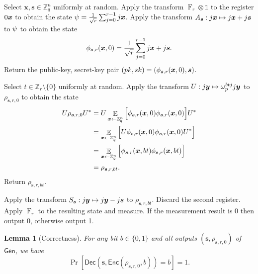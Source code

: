 \documentclass[11pt]{article}
\theoremstyle{plain}
\newtheorem{lemma}[theorem]{Lemma}
\theoremstyle{definition}
\DeclareMathOperator{\qft}{F}
\DeclareMathOperator{\E}{\mathbb{E}}
\let\ket\relax
\DeclarePairedDelimiter{\ket}{\lvert}{\rangle}
\let\bra\relax
\DeclarePairedDelimiter{\bra}{\langle}{\rvert}
\def\Z{\mathbb{Z}}
\def\gen{\mathsf{Gen}}
\def\enc{\mathsf{Enc}}
\def\dec{\mathsf{Dec}}
\begin{document}
\begin{description}[leftmargin = *]
\item [$\gen(1^n)$:] Select $\bm{x}, \bm{s} \in \Z_q^n$ uniformly at random. Apply the transform $\qft_r \otimes \mathds{1}$ to the register $\ket{0} \ket{\bm{x}}$ to obtain the state $\ket{\psi} = \frac{1}{\sqrt{r}} \sum_{j = 0}^{r - 1} \ket{j} \ket{\bm{x}}$. Apply the transform $A_{\bm{s}}: \ket{j}\ket{\bm{x}} \mapsto \ket{j}\ket{\bm{x} + j\bm{s}}$ to $\ket{\psi}$ to obtain the state
\[ \ket{\phi_{\bm{s}, r}(\bm{x}, 0)} = \frac{1}{\sqrt{r}} \sum_{j = 0}^{r - 1} \ket{j} \ket{\bm{x} + j\bm{s}}. \]
Return the public-key, secret-key pair $(pk, sk) = (\ket{\phi_{\bm{s}, r}(\bm{x}, 0)}, \bm{s})$. 

\item [$\enc(pk = \rho_{\bm{s}, r, 0}, b \in \{ 0, 1 \})$:]  Select $t \in \Z_r {\setminus} \{0\}$ uniformly at random. Apply the transform $U: \ket{j}\ket{\bm{y}} \mapsto \omega_p^{btj}\ket{j}\ket{\bm{y}}$ to $\rho_{\bm{s}, r, 0}$ to obtain the state
\begin{align*}
    U \rho_{\bm{s}, r, 0} U^*
    & = U \E_{\bm{x} \leftarrow \Z_q^n} \Big[ \ket{\phi_{\bm{s}, r}(\bm{x}, 0)} \bra{\phi_{\bm{s}, r}(\bm{x}, 0)} \Big] U^* \\
    & = \E_{\bm{x} \leftarrow \Z_q^n} \Big[ U \ket{\phi_{\bm{s}, r}(\bm{x}, 0)} \bra{\phi_{\bm{s}, r}(\bm{x}, 0)} U^* \Big] \\
    & = \E_{\bm{x} \leftarrow \Z_q^n} \Big[ \ket{\phi_{\bm{s}, r}(\bm{x}, bt)} \bra{\phi_{\bm{s}, r}(\bm{x}, bt)} \Big] \\
    & = \rho_{\bm{s}, r, bt}.
\end{align*}
Return $\rho_{\bm{s}, r, bt}$.

\item [$\dec(sk = \bm{s}, c = \rho_{\bm{s}, r, bt})$:]  Apply the transform $S_{\bm{s}}: \ket{j}\ket{\bm{y}} \mapsto \ket{j}\ket{\bm{y} - j\bm{s}}$ to $\rho_{\bm{s}, r, bt}$. Discard the second register. Apply $\qft_r$ to the resulting state and measure. If the measurement result is 0 then output 0, otherwise output 1. 

\end{description}
\begin{lemma}[Correctness]
    For any bit $b \in \{ 0, 1 \}$ and all outputs $(\bm{s}, \rho_{\bm{s}, r, 0})$ of $\gen$, we have
    \[ \Pr [ \dec(\bm{s}, \enc(\rho_{\bm{s}, r, 0}, b)) = b ] = 1. \]
\end{lemma}
\end{document}
